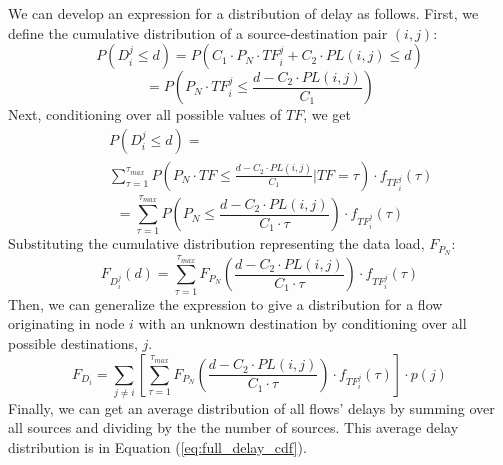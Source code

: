 We can develop an expression for a distribution of delay as follows.  First, we define the cumulative distribution of a source-destination pair $(i,j)$:
\begin{equation*}
	P( D_{i}^{j} \leq d ) = P( C_1 \cdot P_N \cdot TF_{i}^{j} + C_2 \cdot PL(i,j) \leq d )
\end{equation*}
\begin{equation*}
	= P( P_N \cdot TF_{i}^{j} \leq \frac{d - C_2 \cdot PL(i,j)}{C_1}  )
\end{equation*}
Next, conditioning over all possible values of $TF$, we get
\begin{eqnarray*}
	&&P( D_{i}^{j} \leq d ) = \\
	&&\sum\limits_{\tau = 1}^{\tau_{max}} P( P_N \cdot TF \leq \frac{d - C_2 \cdot PL(i,j)}{C_1} | TF = \tau ) \cdot f_{TF_{i}^{j}}(\tau)
\end{eqnarray*}
\begin{equation*}
	= \sum\limits_{\tau = 1}^{\tau_{max}} P( P_N \leq \frac{d - C_2 \cdot PL(i,j)}{C_1 \cdot \tau} ) \cdot f_{TF_{i}^{j}}(\tau)
\end{equation*}
Substituting the cumulative distribution representing the data load, $F_{P_{N}}$:
\begin{equation*}
	F_{D_{i}^{j}}(d) = \sum\limits_{\tau = 1}^{\tau_{max}} F_{P_N}( \frac{d - C_2 \cdot PL(i,j)}{C_1 \cdot \tau} ) \cdot f_{TF_{i}^{j}}(\tau)
\end{equation*}
Then, we can generalize the expression to give a distribution for a flow originating in node $i$ with an unknown destination by conditioning over all possible destinations, $j$.
\begin{equation*}
	F_{D_i} = \sum\limits_{j \neq i} [ \sum\limits_{\tau = 1}^{\tau_{max}} F_{P_N}( \frac{d - C_2 \cdot PL(i,j)}{C_1 \cdot \tau} ) \cdot f_{TF_{i}^{j}}(\tau) ] \cdot p(j)
\end{equation*}
Finally, we can get an average distribution of all flows' delays by summing over all sources and dividing by the the number of sources.  This average delay distribution is in Equation (\ref{eq:full_delay_cdf}).


